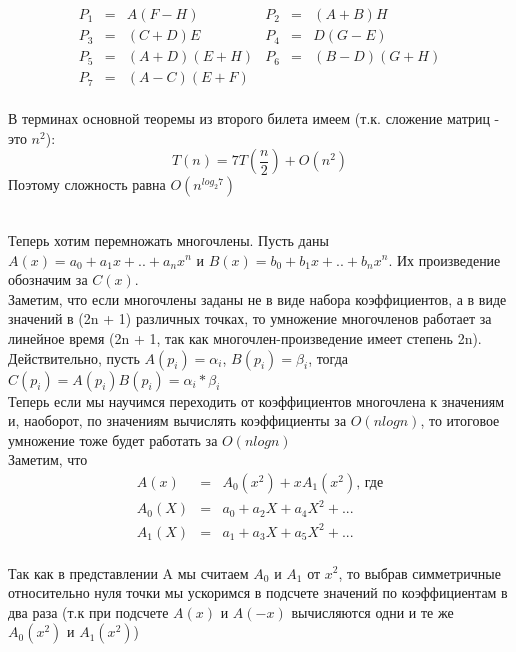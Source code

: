 \begin{equation*}
\begin{array}{llllll}
P_1 &=& A(F - H) & P_2 &=& (A + B)H \\
P_3 &=& (C + D)E & P_4 &=& D(G - E) \\
P_5 &=& (A + D)(E + H) & P_6 &=& (B - D)(G + H) \\
P_7 &=& (A - C)(E + F) &  \\
\end{array}
\end{equation*}

\noindent В терминах основной теоремы из второго билета имеем (т.к. сложение матриц - это $n^2$):
$$
T(n) = 7T(\frac{n}{2}) + O(n^2)
$$
\noindent Поэтому сложность равна $O(n^{log_2 7})$

 \\
Теперь хотим перемножать многочлены. Пусть даны $A(x) = a_0 + a_1 x + .. + a_n x^n$ и $B(x) = b_0 + b_1 x + .. + b_n x^n$. Их произведение обозначим за $C(x).$ \\

\noindent Заметим, что если многочлены заданы не в виде набора коэффициентов, а в виде значений в (2n + 1) различных точках, то умножение многочленов работает за линейное время (2n + 1, так как многочлен-произведение имеет степень 2n). Действительно, пусть $A(p_i) = \alpha_i$, $B(p_i) = \beta_i$, тогда $C(p_i) = A(p_i) B(p_i) = \alpha_i * \beta_i$ \\

\noindent Теперь если мы научимся переходить от коэффициентов многочлена к значениям и, наоборот, по значениям вычислять коэффициенты за $O(n log n)$, то итоговое умножение тоже будет работать за $O(n log n)$ \\

\noindent Заметим, что
\begin{equation*}
\begin{array}{lll}
A(x) &=& A_0(x^2) + x A_1(x^2)\text{, где} \\
A_0(X) &=& a_0 + a_2 X + a_4 X^2 + ... \\
A_1(X) &=& a_1 + a_3 X + a_5 X^2 + ...
\end{array}
\end{equation*} \\

\noindent Так как в представлении A мы считаем $A_0$ и $A_1$ от $x^2$, то выбрав симметричные относительно нуля точки мы ускоримся в подсчете значений по коэффициентам в два раза (т.к при подсчете $A(x)$ и $A(-x)$ вычисляются одни и те же $A_0(x^2)$ и $A_1(x^2)$) \\

